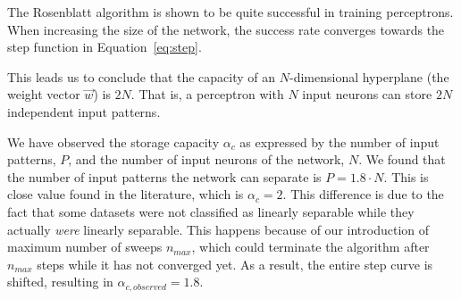 The Rosenblatt algorithm is shown to be quite successful in training perceptrons.
When increasing the size of the network, the success rate converges towards the step function in Equation~\ref{eq:step}.

This leads us to conclude that the capacity of an \(N\)-dimensional hyperplane (the weight vector \(\vec{w}\)) is \(2N\).
That is, a perceptron with \(N\) input neurons can store \(2N\) independent input patterns.

We have observed the storage capacity $\alpha_c$ as expressed by the number of input patterns, $P$, and the number of input neurons of the network, $N$.
We found that the number of input patterns the network can separate is $P = 1.8 \cdot N$.
This is close value found in the literature, which is $\alpha_c = 2$.
This difference is due to the fact that some datasets were not classified as linearly separable while they actually \emph{were} linearly separable.
This happens because of our introduction of maximum number of sweeps $n_{max}$, which could terminate the algorithm after $n_{max}$ steps while it has not converged yet.
As a result, the entire step curve is shifted, resulting in $\alpha_{c, observed} = 1.8$.